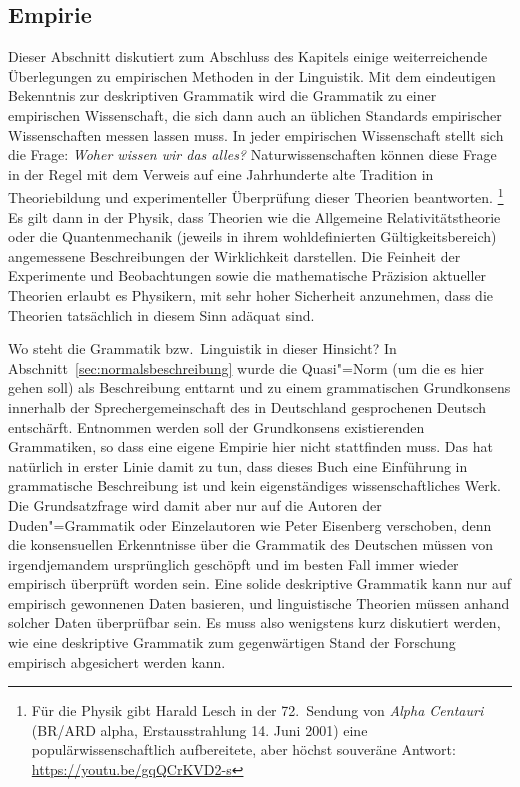 \subsection{Empirie}
\label{sec:deskriptivtheoretisch}


Dieser Abschnitt diskutiert zum Abschluss des Kapitels einige weiterreichende Überlegungen zu empirischen Methoden in der Linguistik.
Mit dem eindeutigen Bekenntnis zur deskriptiven Grammatik wird die Grammatik zu einer empirischen Wissenschaft, die sich dann auch an üblichen Standards empirischer Wissenschaften messen lassen muss.     
In jeder empirischen Wissenschaft stellt sich die Frage:
\textit{Woher wissen wir das alles?}
Naturwissenschaften können diese Frage in der Regel mit dem Verweis auf eine Jahrhunderte alte Tradition in Theoriebildung und experimenteller Überprüfung dieser Theorien beantworten.%
\footnote{Für die Physik gibt Harald Lesch in der 72.\ Sendung von \textit{Alpha Centauri} (BR\slash ARD alpha, Erstausstrahlung 14. Juni 2001) eine populärwissenschaftlich aufbereitete, aber höchst souveräne Antwort: \url{https://youtu.be/gqQCrKVD2-s}}
Es gilt dann \zB in der Physik, dass Theorien wie die Allgemeine Relativitätstheorie oder die Quantenmechanik (jeweils in ihrem wohldefinierten Gültigkeitsbereich) angemessene Beschreibungen der Wirklichkeit darstellen.
Die Feinheit der Experimente und Beobachtungen sowie die mathematische Präzision aktueller Theorien erlaubt es Physikern, mit sehr hoher Sicherheit anzunehmen, dass die Theorien tatsächlich in diesem Sinn adäquat sind.

Wo steht die Grammatik bzw.\ Linguistik in dieser Hinsicht?
In Abschnitt~\ref{sec:normalsbeschreibung} wurde die Quasi"=Norm (um die es hier gehen soll) als Beschreibung enttarnt und zu einem grammatischen Grundkonsens innerhalb der Sprechergemeinschaft des in Deutschland gesprochenen Deutsch entschärft.
Entnommen werden soll der Grundkonsens existierenden Grammatiken, so dass eine eigene Empirie hier nicht stattfinden muss.
Das hat natürlich in erster Linie damit zu tun, dass dieses Buch eine Einführung in grammatische Beschreibung ist und kein eigenständiges wissenschaftliches Werk.
Die Grundsatzfrage wird damit aber nur auf die Autoren der Duden"=Grammatik oder Einzelautoren wie Peter Eisenberg verschoben, denn die konsensuellen Erkenntnisse über die Grammatik des Deutschen müssen von irgendjemandem ursprünglich geschöpft und im besten Fall immer wieder empirisch überprüft worden sein.
Eine solide deskriptive Grammatik kann nur auf empirisch gewonnenen Daten basieren, und linguistische Theorien müssen anhand solcher Daten überprüfbar sein.
Es muss also wenigstens kurz diskutiert werden, wie eine deskriptive Grammatik zum gegenwärtigen Stand der Forschung empirisch abgesichert werden kann.

